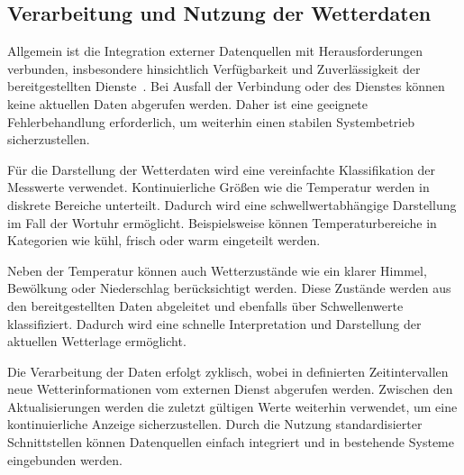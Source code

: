\subsection{Verarbeitung und Nutzung der Wetterdaten}Allgemein ist die Integration externer Datenquellen mit Herausforderungen verbunden, insbesondere hinsichtlich Verfügbarkeit und Zuverlässigkeit der bereitgestellten Dienste~\cite{7123563}. 
Bei Ausfall der Verbindung oder des Dienstes können keine aktuellen Daten abgerufen werden. 
Daher ist eine geeignete Fehlerbehandlung erforderlich, um weiterhin einen stabilen Systembetrieb sicherzustellen.

Für die Darstellung der Wetterdaten wird eine vereinfachte Klassifikation der Messwerte verwendet. 
Kontinuierliche Größen wie die Temperatur werden in diskrete Bereiche unterteilt. 
Dadurch wird eine schwellwertabhängige Darstellung im Fall der Wortuhr ermöglicht. 
Beispielsweise können Temperaturbereiche in Kategorien wie kühl, frisch oder warm eingeteilt werden.

Neben der Temperatur können auch Wetterzustände wie ein klarer Himmel, Bewölkung oder Niederschlag berücksichtigt werden. 
Diese Zustände werden aus den bereitgestellten Daten abgeleitet und ebenfalls über Schwellenwerte klassifiziert. 
Dadurch wird eine schnelle Interpretation und Darstellung der aktuellen Wetterlage ermöglicht. 

Die Verarbeitung der Daten erfolgt zyklisch, wobei in definierten Zeitintervallen neue Wetterinformationen vom externen Dienst abgerufen werden. 
Zwischen den Aktualisierungen werden die zuletzt gültigen Werte weiterhin verwendet, um eine kontinuierliche Anzeige sicherzustellen.
Durch die Nutzung standardisierter Schnittstellen können Datenquellen einfach integriert und in bestehende Systeme eingebunden werden.
